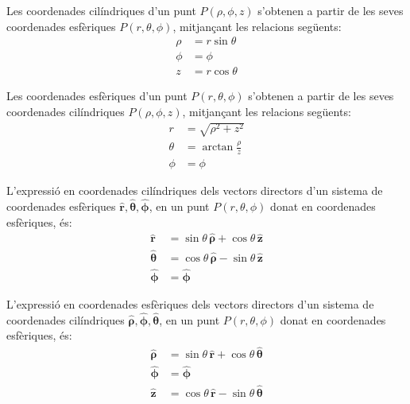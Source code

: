 \documentclass[catalan,a4paper,twoside,11pt]{article}
\begin{document}
Les coordenades cilíndriques  d'un punt $P(\rho,\phi,z)$
s'obtenen a partir de les seves coordenades esfèriques
$P(r,\theta,\phi)$, mitjançant les relacions següents:
\begin{subequations}\begin{align}
    \rho &=r\sin\theta \\ \phi &=\phi \\z &=r\cos\theta
\end{align}\end{subequations}

Les coordenades  esfèriques  d'un punt $P(r,\theta,\phi)$
s'obtenen a partir de les seves coordenades cilíndriques
$P(\rho,\phi,z)$, mitjançant les relacions següents:
\begin{subequations}\begin{align}
    r &=\sqrt{\rho^2+z^2}\\
    \theta &=\arctan\frac{\rho}{z}\\
    \phi &=\phi
\end{align}\end{subequations}

L'expressió en coordenades cilíndriques dels vectors directors d'un sistema de coordenades  esfèriques $\boldsymbol{\hat{r}},\boldsymbol{\hat{\theta}},\boldsymbol{\hat{\phi}}$, en un punt $P(r,\theta,\phi)$ donat en coordenades esfèriques, és:
\begin{subequations}\begin{align}
    \boldsymbol{\hat{r}} &=\sin\theta\,\boldsymbol{\hat{\rho}}+\cos\theta\,\boldsymbol{\hat{z}}\\
    \boldsymbol{\hat{\theta}}
    &=\cos\theta\,\boldsymbol{\hat{\rho}}-\sin\theta\,\boldsymbol{\hat{z}}\\
    \boldsymbol{\hat{\phi}}&=\boldsymbol{\hat{\phi}}
\end{align}\end{subequations}

L'expressió en coordenades esfèriques dels vectors directors d'un sistema de coordenades  cilíndriques $\boldsymbol{\hat{\rho}},\boldsymbol{\hat{\phi}},\boldsymbol{\hat{\theta}}$, en un punt $P(r,\theta,\phi)$ donat en coordenades esfèriques, és:
\begin{subequations}\begin{align}
    \boldsymbol{\hat{\rho}} &=\sin\theta\,\boldsymbol{\hat{r}}+
    \cos\theta\,\boldsymbol{\hat{\theta}}\\
    \boldsymbol{\hat{\phi}}&=\boldsymbol{\hat{\phi}}\\
    \boldsymbol{\hat{z}} &=\cos\theta\,\boldsymbol{\hat{r}}-
    \sin\theta\,\boldsymbol{\hat{\theta}}
\end{align}\end{subequations}
\end{document}
